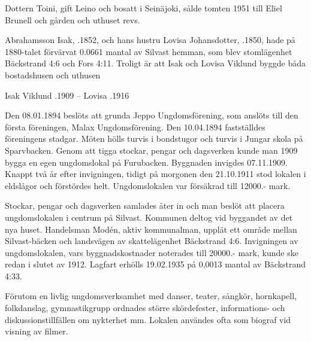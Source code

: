 Dottern Toini, gift Leino och bosatt i Seinäjoki, sålde tomten 1951 till Eliel Brunell och gården och uthuset revs.

 Abrahamsson Isak, .1852, och hans hustru Lovisa Johansdotter, .1850, hade på 1880-talet förvärvat 0.0661 mantal av Silvast hemman, som blev stomlägenhet Bäckstrand 4:6 och Fors 4:11. Troligt är att Isak och Lovisa Viklund byggde båda bostadshusen och uthusen
\begin{jhchildren}
  \item {}
  \item {}
  \item {}
\end{jhchildren}

Isak Viklund .1909  --  Lovisa .1916







Den 08.01.1894 beslöts att grunda Jeppo Ungdomsförening, som anslöts till den första föreningen, Malax Ungdomsförening. Den 10.04.1894 fastställdes föreningens stadgar. Möten hölls turvis i bondstugor och turvis i Jungar skola på Sparvbacken. Genom att tigga stockar, pengar och dagsverken kunde man 1909 bygga en egen ungdomslokal på Furubacken.  Byggnaden invigdes 07.11.1909. Knappt två år efter invigningen, tidigt på morgonen den 21.10.1911 stod lokalen i eldslågor och förstördes helt. Ungdomslokalen var försäkrad till 12000.- mark.

Stockar, pengar och dagsverken samlades åter in och man beslöt att placera ungdomslokalen i centrum på Silvast. Kommunen deltog vid byggandet av det nya huset. Handelsman Modén, aktiv kommunalman, upplät ett område mellan Silvast-bäcken och landsvägen av skattelägenhet Bäckstrand 4:6. Invigningen av ungdomslokalen, vars byggnadskostnader noterades till 20000.- mark, kunde ske redan i slutet av 1912. Lagfart erhölls 19.02.1935 på 0,0013 mantal av Bäckstrand 4:33.

Förutom en livlig ungdomsverksamhet med danser, teater, sångkör, hornkapell, folkdanslag, gymnastikgrupp ordnades större skördefester, informations- och diskussionstillfällen om nykterhet mm. Lokalen användes ofta som biograf vid visning av filmer.

